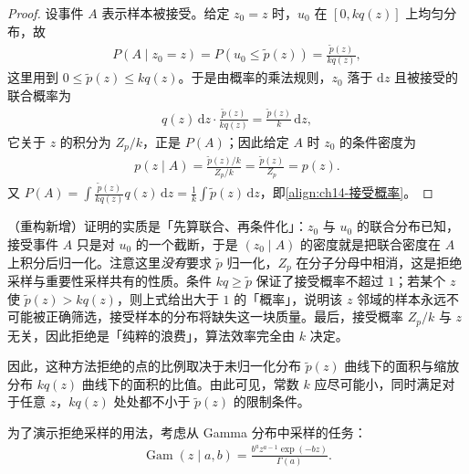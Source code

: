 \documentclass[../../main.tex]{subfiles}
\begin{document}
\begin{proof}
设事件 $A$ 表示样本被接受。给定 $z_{0}=z$ 时，$u_{0}$ 在 $\left[0,kq(z)\right]$ 上均匀分布，故
\begin{align*}
P\left(A\mid z_{0}=z\right)=P\left(u_{0}\leqslant\widetilde{p}(z)\right)=\frac{\widetilde{p}(z)}{kq(z)},
\end{align*}
这里用到 $0\leqslant\widetilde{p}(z)\leqslant kq(z)$。于是由概率的乘法规则，$z_{0}$ 落于 $\mathrm{d}z$ 且被接受的联合概率为
\begin{align*}
q(z)\,\mathrm{d}z\cdot\frac{\widetilde{p}(z)}{kq(z)}=\frac{\widetilde{p}(z)}{k}\,\mathrm{d}z,
\end{align*}
它关于 $z$ 的积分为 $Z_{p}/k$，正是 $P(A)$；因此给定 $A$ 时 $z_{0}$ 的条件密度为
\begin{align*}
p\left(z\mid A\right)=\frac{\widetilde{p}(z)/k}{Z_{p}/k}=\frac{\widetilde{p}(z)}{Z_{p}}=p(z).
\end{align*}
又 $P(A)=\int\frac{\widetilde{p}(z)}{kq(z)}q(z)\,\mathrm{d}z=\frac{1}{k}\int\widetilde{p}(z)\,\mathrm{d}z$，即\eqref{align:ch14-接受概率}。
\end{proof}

\begin{remark}（重构新增）证明的实质是「先算联合、再条件化」：$z_{0}$ 与 $u_{0}$ 的联合分布已知，接受事件 $A$ 只是对 $u_{0}$ 的一个截断，于是 $\left(z_{0}\mid A\right)$ 的密度就是把联合密度在 $A$ 上积分后归一化。注意这里\emph{没有}要求 $\widetilde{p}$ 归一化，$Z_{p}$ 在分子分母中相消，这是拒绝采样与重要性采样共有的性质。条件 $kq\geqslant\widetilde{p}$ 保证了接受概率不超过 $1$；若某个 $z$ 使 $\widetilde{p}(z)>kq(z)$，则上式给出大于 $1$ 的「概率」，说明该 $z$ 邻域的样本永远不可能被正确筛选，接受样本的分布将缺失这一块质量。最后，接受概率 $Z_{p}/k$ 与 $z$ 无关，因此拒绝是「纯粹的浪费」，算法效率完全由 $k$ 决定。
\end{remark}

因此，这种方法拒绝的点的比例取决于未归一化分布 $\widetilde{p}(z)$ 曲线下的面积与缩放分布 $kq(z)$ 曲线下的面积的比值。由此可见，常数 $k$ 应尽可能小，同时满足对于任意 $z$，$kq(z)$ 处处都不小于 $\widetilde{p}(z)$ 的限制条件。

为了演示拒绝采样的用法，考虑从 Gamma 分布中采样的任务：
\begin{align}
\operatorname{Gam}(z\mid a,b)=\frac{b^{a}z^{a-1}\exp(-bz)}{\Gamma(a)}.
\label{align:ch14-gamma}
\end{align}
\end{document}
